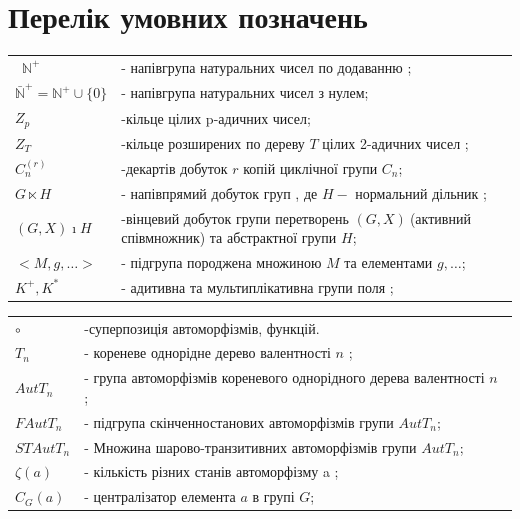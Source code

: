 \documentclass[a4paper,12pt]{article} \usepackage{a4wide}
\numberwithin{equation}{subsection}
\begin{document}
\section*{Перелік умовних позначень}
 \bigskip
\begin{tabular}{ p{2.4in} p{3.5in} }
  \
  $\mathbb{N}^+$ & - напівгрупа натуральних чисел  по додаванню ; \\
  $\bar{\mathbb{N}}^+ = \mathbb{N}^+ \cup \{ 0 \}$ & - напівгрупа натуральних чисел з нулем; \\
  $Z_p$ & -кільце цілих p-адичних чисел;\\
  $Z_T$ & -кільце розширених по дереву $T$ цілих 2-адичних чисел ;\\
  $C_n^{(r)} $& -декартів добуток $r$ копій циклічної групи $C_n$;  \\




  $G \ltimes H $ & - напівпрямий добуток груп , де $H-$ нормальний дільник ; \\
  $\left(G,X \right) \imath  H $ & -вінцевий добуток групи перетворень $\left(G,X \right)\ $(активний співмножник) та
  абстрактної групи $H$; \\


  $<M,g,\ldots > $ &- підгрупа породжена множиною $M$ та елементами $g,\ldots $; \\
  $K^+, K^* $ & - адитивна та мультиплікативна групи поля ; \\

\end{tabular}

\begin{tabular}{ p{2in} p{3.5in} }








  $\circ$& -суперпозиція автоморфізмів, функцій. \\
  $T_n $&- кореневе однорідне дерево валентності $n$ ;\\
  $AutT_n $&- група автоморфізмів кореневого однорідного дерева валентності $n$ ;\\
  $FAutT_n $&- підгрупа скінченностанових автоморфізмів групи  $AutT_n $;\\
  $STAutT_n $&- Множина шарово-транзитивних автоморфізмів групи  $AutT_n $;\\
  $\zeta(a) $&- кількість різних станів автоморфізму a ;\\

  $C_G(a)$&- централізатор елемента $a$ в групі $G$;\\
\end{tabular}
\newpage
\end{document}
